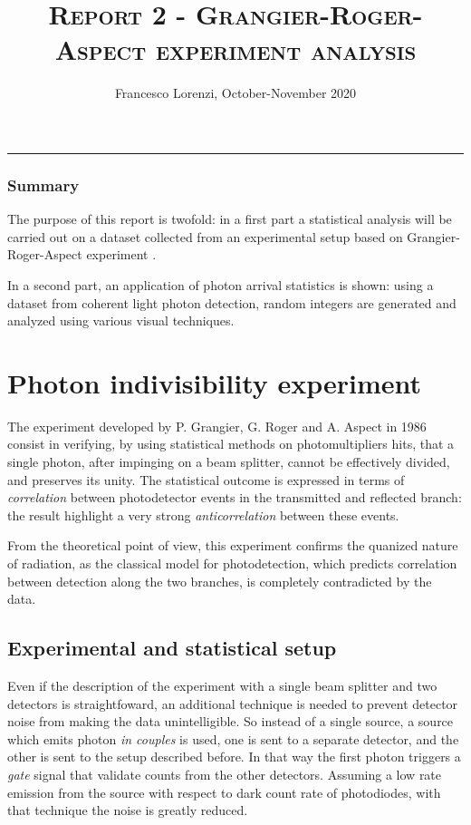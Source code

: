 \documentclass[10pt, final]{article}
\title{\textsc{Report 2 - Grangier-Roger-Aspect experiment analysis}}
\author{Francesco Lorenzi,      October-November 2020}
\date{}
\begin{document}
\maketitle
\vspace{-25pt}

\begin{center}
	\rule[0pt]{400pt}{0.5pt}
\end{center}
\vspace{-15pt}

\begin{multicols}{2}
\subsubsection*{Summary}
The purpose of this report is twofold: in a first part a statistical analysis will be carried out on a dataset collected from an experimental setup based on Grangier-Roger-Aspect experiment \cite{grangier}. 

In a second part, an application of photon arrival statistics is shown: using a dataset from coherent light photon detection, random integers are generated and analyzed using various visual techniques.

\section{Photon indivisibility experiment}
The experiment developed by P. Grangier, G. Roger and A. Aspect in 1986 consist in verifying, by using statistical methods on photomultipliers hits, that a single  photon, after impinging on a beam splitter, cannot be effectively divided, and preserves its unity. The statistical outcome is expressed in terms of \emph{correlation} between photodetector events in the transmitted and reflected branch: the result highlight a very strong \emph{anticorrelation} between these events.

From the theoretical point of view, this experiment confirms the quanized nature of radiation, as the classical model for photodetection, which predicts correlation between detection along the two branches, is completely contradicted by the data.
\subsection*{Experimental and statistical setup}
Even if the description of the experiment with a single beam splitter and two detectors is straightfoward, an additional technique is needed to prevent detector noise from making the data unintelligible.
So instead of a single source, a source which emits photon \emph{in couples} is used, one is sent to a separate detector, and the other is sent to the setup described before. In that way the first photon triggers a \emph{gate} signal that validate counts from the other detectors. Assuming a low rate emission from the source with respect to dark count rate of photodiodes, with that technique the noise is greatly reduced.


\end{multicols}
\end{document}
